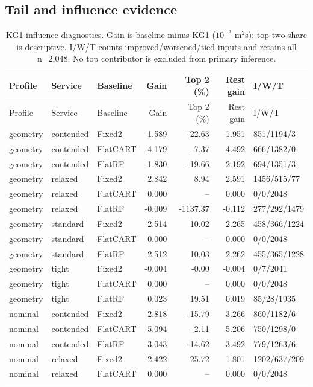 \subsection{Tail and influence evidence}
\small\begin{longtable}{@{}lllrrrl@{}}
\caption{KG1 influence diagnostics. Gain is baseline minus KG1 ($10^{-3}$ m$^2$s); top-two share is descriptive. I/W/T counts improved/worsened/tied inputs and retains all n=2,048. No top contributor is excluded from primary inference.}\label{supp:influence}\\\toprule
Profile & Service & Baseline & Gain & Top 2 (\%) & Rest gain & I/W/T\\\midrule\endfirsthead
\toprule
Profile & Service & Baseline & Gain & Top 2 (\%) & Rest gain & I/W/T\\\midrule\endhead
geometry & contended & Fixed2 & -1.589 & -22.63 & -1.951 & 851/1194/3\\
geometry & contended & FlatCART & -4.179 & -7.37 & -4.492 & 666/1382/0\\
geometry & contended & FlatRF & -1.830 & -19.66 & -2.192 & 694/1351/3\\
geometry & relaxed & Fixed2 & 2.842 & 8.94 & 2.591 & 1456/515/77\\
geometry & relaxed & FlatCART & 0.000 & -- & 0.000 & 0/0/2048\\
geometry & relaxed & FlatRF & -0.009 & -1137.37 & -0.112 & 277/292/1479\\
geometry & standard & Fixed2 & 2.514 & 10.02 & 2.265 & 458/366/1224\\
geometry & standard & FlatCART & 0.000 & -- & 0.000 & 0/0/2048\\
geometry & standard & FlatRF & 2.512 & 10.03 & 2.262 & 455/365/1228\\
geometry & tight & Fixed2 & -0.004 & -0.00 & -0.004 & 0/7/2041\\
geometry & tight & FlatCART & 0.000 & -- & 0.000 & 0/0/2048\\
geometry & tight & FlatRF & 0.023 & 19.51 & 0.019 & 85/28/1935\\
nominal & contended & Fixed2 & -2.818 & -15.79 & -3.266 & 860/1182/6\\
nominal & contended & FlatCART & -5.094 & -2.11 & -5.206 & 750/1298/0\\
nominal & contended & FlatRF & -3.043 & -14.62 & -3.492 & 779/1263/6\\
nominal & relaxed & Fixed2 & 2.422 & 25.72 & 1.801 & 1202/637/209\\
nominal & relaxed & FlatCART & 0.000 & -- & 0.000 & 0/0/2048\\

\end{longtable}
